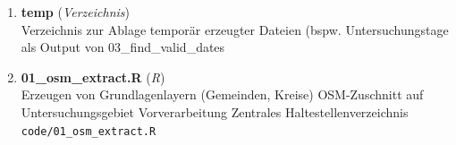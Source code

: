\begin{enumerate}[label=B\arabic*, ref=B\arabic*, leftmargin=*, itemsep=0.5em, topsep=0.3em]
\begin{enumerate}[label=B\arabic{enumi}-\arabic*, ref=B\arabic{enumi}-\arabic*, leftmargin=*, itemsep=0.5em, topsep=0.3em]
\begin{enumerate}[label=B\arabic{enumi}-\arabic{enumii}-\arabic*, ref=B\arabic{enumi}-\arabic{enumii}-\arabic*, leftmargin=*, itemsep=0.5em, topsep=0.3em]
\texttt{\small code/helper/mode\_value.R}
\edef\appendixlabelkey{app:B\arabic{enumi}-\arabic{enumii}-\arabic{enumiii}}
\expandafter\label\expandafter{\appendixlabelkey}
\item \textbf{pointgrid\_fun.R} \textnormal{(\textit{R})}\\
Erstellung einer r5r-kompatiblen Tabelle aus einem Geogitter\\
\texttt{\small code/helper/pointgrid\_fun.R}
\edef\appendixlabelkey{app:B\arabic{enumi}-\arabic{enumii}-\arabic{enumiii}}
\expandafter\label\expandafter{\appendixlabelkey}
\item \textbf{pois\_fun.R} \textnormal{(\textit{R})}\\
Erstellung von r5r-kompatiblen Tabellen für Start- und Zielpunkte\\
\texttt{\small code/helper/pois\_fun.R}
\edef\appendixlabelkey{app:B\arabic{enumi}-\arabic{enumii}-\arabic{enumiii}}
\expandafter\label\expandafter{\appendixlabelkey}
\item \textbf{polygrid\_fun.R} \textnormal{(\textit{R})}\\
Erstellung eines Geogitters\\
\texttt{\small code/helper/polygrid\_fun.R}
\edef\appendixlabelkey{app:B\arabic{enumi}-\arabic{enumii}-\arabic{enumiii}}
\expandafter\label\expandafter{\appendixlabelkey}
\item \textbf{school\_holidays.R} \textnormal{(\textit{R})}\\
Abfrage von Schulferien per API\\
\texttt{\small code/helper/school\_holidays.R}
\edef\appendixlabelkey{app:B\arabic{enumi}-\arabic{enumii}-\arabic{enumiii}}
\expandafter\label\expandafter{\appendixlabelkey}
\end{enumerate}
\item \textbf{temp} \textnormal{(\textit{Verzeichnis})}\\
Verzeichnis zur Ablage temporär erzeugter Dateien (bspw. Untersuchungstage als Output von 03\_find\_valid\_dates
\edef\appendixlabelkey{app:B\arabic{enumi}-\arabic{enumii}}
\expandafter\label\expandafter{\appendixlabelkey}
\item \textbf{01\_osm\_extract.R} \textnormal{(\textit{R})}\\
Erzeugen von Grundlagenlayern (Gemeinden, Kreise)
OSM-Zuschnitt auf Untersuchungsgebiet
Vorverarbeitung Zentrales Haltestellenverzeichnis\\
\texttt{\small code/01\_osm\_extract.R}
\edef\appendixlabelkey{app:B\arabic{enumi}-\arabic{enumii}}

\end{enumerate}
\end{enumerate}
